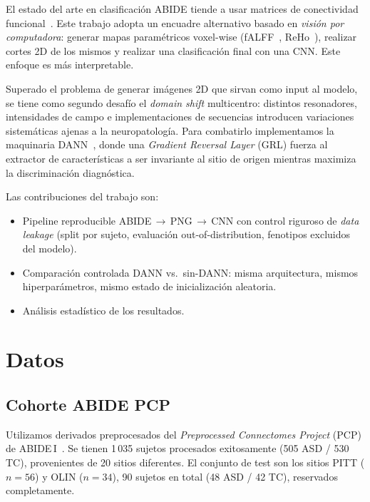 \documentclass[conference]{IEEEtran}
\begin{document}
El estado del arte en clasificación ABIDE tiende a usar matrices de
conectividad funcional~\cite{heinsfeld2018}. Este trabajo adopta un
encuadre alternativo basado en \emph{visión por computadora}: generar mapas
paramétricos voxel-wise (fALFF~\cite{zou2008}, ReHo~\cite{zang2004}), realizar cortes 2D de los mismos y realizar una clasificación final con una CNN. Este enfoque
es más interpretable.

Superado el problema de generar imágenes 2D que sirvan como input al modelo, se tiene como segundo desafío el \emph{domain shift} multicentro: distintos
resonadores, intensidades de campo e implementaciones de secuencias
introducen variaciones sistemáticas ajenas a la neuropatología. Para
combatirlo implementamos la maquinaria DANN~\cite{ganin2016}, donde
una \emph{Gradient Reversal Layer} (GRL) fuerza al extractor de
características a ser invariante al sitio de origen mientras maximiza
la discriminación diagnóstica.

Las contribuciones del trabajo son:
\begin{itemize}
  \item Pipeline reproducible ABIDE\,$\to$\,PNG\,$\to$\,CNN con control
        riguroso de \emph{data leakage} (split por sujeto, evaluación
        out-of-distribution, fenotipos excluidos del modelo).
  \item Comparación controlada DANN vs.\ sin-DANN: misma arquitectura,
        mismos hiperparámetros, mismo estado de inicialización aleatoria.
  \item Análisis estadístico de los resultados.
\end{itemize}

\section{Datos}

\subsection{Cohorte ABIDE PCP}

Utilizamos derivados preprocesados del \emph{Preprocessed Connectomes
Project} (PCP) de ABIDE\,I~\cite{craddock2013}.
Se tienen 1\,035 sujetos procesados exitosamente
(505 ASD / 530 TC), provenientes de 20 sitios diferentes. El conjunto de test
son los sitios PITT ($n\!=\!56$) y OLIN ($n\!=\!34$), 90 sujetos en
total (48 ASD / 42 TC), reservados completamente.
\end{document}
